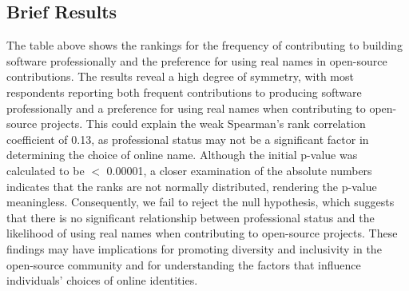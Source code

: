 \documentclass[journal,12pt,onecolumn,]{IEEEtran}
\begin{document}
\subsection{Brief Results}
The table above shows the rankings for the frequency of contributing to building software professionally and the preference for using real names in open-source contributions. 
The results reveal a high degree of symmetry, with most respondents reporting both frequent contributions to producing software professionally and a preference for using real names when contributing to open-source projects. 
This could explain the weak Spearman's rank correlation coefficient of 0.13, as professional status may not be a significant factor in determining the choice of online name. 
Although the initial p-value was calculated to be $<$ 0.00001, a closer examination of the absolute numbers indicates that the ranks are not normally distributed, rendering the p-value meaningless. 
Consequently, we fail to reject the null hypothesis, which suggests that there is no significant relationship between professional status and the likelihood of using real names when contributing to open-source projects. 
These findings may have implications for promoting diversity and inclusivity in the open-source community and for understanding the factors that influence individuals' choices of online identities.





\end{document}
